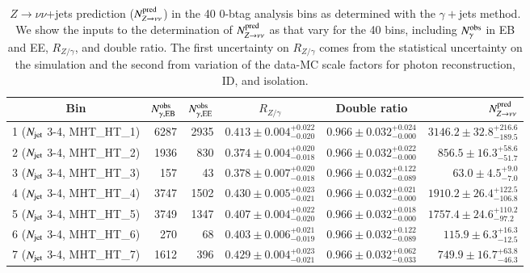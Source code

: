 


\begin{table}[h]
\caption{$Z\to\nu\nu$+jets prediction ($N_{Z\to\nu\nu}^{\rm pred}$) in
  the 40 0-btag analysis bins as determined with the $\gamma +$jets method.  We
  show the inputs to the determination of $N_{Z\to\nu\nu}^{\rm pred}$ as
   that vary for the 40 bins, including
  $N_{\gamma}^{\rm obs}$ in EB and EE, $R_{Z/\gamma}$, and double ratio. The first
  uncertainty on $R_{Z/\gamma}$ comes from the statistical uncertainty on the
  simulation and the second from
  variation of the data-MC scale factors for photon reconstruction, ID,
  and isolation.  
}
\label{tab:gjets_res}
\hspace{-0.50in}\begin{tabular}{|c|rr|c|c|r|}
\hline
Bin & $N_{\gamma, {\rm EB}}^{\rm obs}$ & $N_{\gamma, {\rm EE}}^{\rm obs}$ & $R_{Z/\gamma}$ & Double ratio  &  $N_{Z\to\nu\nu}^{\rm pred}$ \\
\hline
 1 ($N_{\rm jet}$ 3-4, MHT\_HT\_1)    & 6287 &  2935 & $0.413\pm0.004^{+0.022}_{-0.020}$ & $0.966\pm0.032^{+0.024}_{-0.000}$ & $3146.2\pm32.8^{+216.6}_{-189.5}$ \\  
 2 ($N_{\rm jet}$ 3-4, MHT\_HT\_2)    & 1936 &   830 & $0.374\pm0.004^{+0.020}_{-0.018}$ & $0.966\pm0.032^{+0.022}_{-0.000}$ & $ 856.5\pm16.3^{+58.6}_{-51.7}$ \\      
 3 ($N_{\rm jet}$ 3-4, MHT\_HT\_3)    &  157 &    43 & $0.378\pm0.007^{+0.020}_{-0.018}$ & $0.966\pm0.032^{+0.122}_{-0.089}$ & $  63.0\pm 4.5^{+ 9.0}_{- 7.0}$ \\      
 4 ($N_{\rm jet}$ 3-4, MHT\_HT\_4)    & 3747 &  1502 & $0.430\pm0.005^{+0.023}_{-0.021}$ & $0.966\pm0.032^{+0.021}_{-0.000}$ & $1910.2\pm26.4^{+122.5}_{-106.8}$ \\  
 5 ($N_{\rm jet}$ 3-4, MHT\_HT\_5)    & 3749 &  1347 & $0.407\pm0.004^{+0.022}_{-0.020}$ & $0.966\pm0.032^{+0.018}_{-0.000}$ & $1757.4\pm24.6^{+110.2}_{-97.2}$ \\     
 6 ($N_{\rm jet}$ 3-4, MHT\_HT\_6)    &  270 &    68 & $0.403\pm0.006^{+0.021}_{-0.019}$ & $0.966\pm0.032^{+0.122}_{-0.089}$ & $ 115.9\pm 6.3^{+16.3}_{-12.5}$ \\      
 7 ($N_{\rm jet}$ 3-4, MHT\_HT\_7)    & 1612 &   396 & $0.429\pm0.004^{+0.023}_{-0.021}$ & $0.966\pm0.032^{+0.062}_{-0.033}$ & $ 749.9\pm16.7^{+63.8}_{-46.3}$ \\      

\end{tabular}
\end{table}
